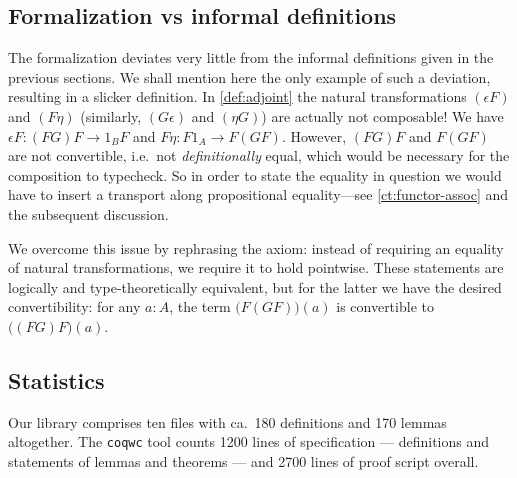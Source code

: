 \subsection*{Formalization vs informal definitions}

The formalization deviates very little from the informal definitions given in the previous sections.
We shall mention here the only example of such a deviation, resulting in a slicker definition. 
In \autoref{def:adjoint} the natural transformations $(\epsilon F)$ and $(F\eta)$ (similarly, 
$(G\epsilon)$ and $(\eta G)$) are actually not
composable! We have $\epsilon F : (FG)F \to 1_{B}F$ and $F\eta : F1_A \to F(GF)$. 
However, $(FG)F$ and $F(GF)$ are not convertible, i.e.\ not \emph{definitionally} equal, 
which would be necessary for the composition to typecheck. So in order to state the equality in question
we would have to insert a transport along propositional equality---see \autoref{ct:functor-assoc} and the subsequent discussion.

We overcome this issue by rephrasing the axiom: instead of requiring an equality of natural 
transformations, we require it to hold pointwise. 
These statements are logically and type-theoretically equivalent, but for the latter we have the
desired convertibility: for any $a : A$, the term $\big(F(GF)\big)(a)$ is convertible to $\big((FG)F\big)(a)$.



\subsection*{Statistics}

Our library comprises ten files with ca.\ 180 definitions and 170 lemmas altogether.
The \texttt{coqwc} tool counts 1200 lines of specification --- definitions and statements of lemmas and theorems ---
and 2700 lines of proof script overall.





